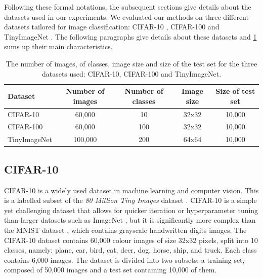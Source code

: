 Following these formal notations, the subsequent sections give details about the
datasets used in our experiments. We evaluated our methods on three different
datasets tailored for image classification: CIFAR-10 \cite{CIFARdataset},
CIFAR-100 \cite{CIFARdataset} and TinyImageNet \cite{TinyImageNet}. The
following paragraphs give details about these datasets and
\cref{tab:dlo:datasets} sums up their main characteristics.\\

\begin{table}[ht!]
  \centering
  \begin{tabular}{lcccc}
    \toprule
    \textbf{Dataset}    & \textbf{Number of images} & \textbf{Number of classes} &
    \textbf{Image size} & \textbf{Size of test set}                                               \\
    \hline
    CIFAR-10            & 60,000                    & 10                         & 32x32 & 10,000 \\
    CIFAR-100           & 60,000                    & 100                        & 32x32 & 10,000 \\
    TinyImageNet        & 100,000                   & 200                        & 64x64 & 10,000 \\
    \bottomrule
  \end{tabular}
  \caption{The number of images, of classes, image size and size of the test
    set for the three datasets used: CIFAR-10, CIFAR-100 and TinyImageNet.}
  \label{tab:dlo:datasets}
\end{table}

\subsection{CIFAR-10}

CIFAR-10 \cite{CIFARdataset} is a widely used dataset in machine learning and
computer vision. This is a labelled subset of the \emph{80 Million Tiny Images}
dataset \cite{4531741}. CIFAR-10 is a simple yet challenging dataset that allows
for quicker iteration or hyperparameter tuning than larger datasets such as
ImageNet \cite{DBLP:journals/ijcv/RussakovskyDSKS15}, but it is significantly
more complex than the MNIST dataset \cite{6296535}, which contains grayscale
handwritten digits images. The CIFAR-10 dataset contains 60,000 colour images of
size 32x32 pixels, split into 10 classes, namely: plane, car, bird, cat, deer,
dog, horse, ship, and truck. Each class contains 6,000 images. The dataset is
divided into two subsets: a training set, composed of 50,000 images and a test set
containing 10,000 of them.\\

